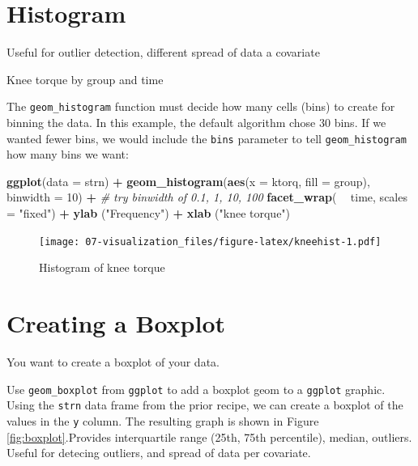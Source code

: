 \documentclass[
]{book}
\newenvironment{Shaded}{\begin{snugshade}}{\end{snugshade}}
\newcommand{\CommentTok}[1]{\textcolor[rgb]{0.56,0.35,0.01}{\textit{#1}}}
\newcommand{\DataTypeTok}[1]{\textcolor[rgb]{0.13,0.29,0.53}{#1}}
\newcommand{\DecValTok}[1]{\textcolor[rgb]{0.00,0.00,0.81}{#1}}
\newcommand{\KeywordTok}[1]{\textcolor[rgb]{0.13,0.29,0.53}{\textbf{#1}}}
\newcommand{\NormalTok}[1]{#1}
\newcommand{\OperatorTok}[1]{\textcolor[rgb]{0.81,0.36,0.00}{\textbf{#1}}}
\newcommand{\StringTok}[1]{\textcolor[rgb]{0.31,0.60,0.02}{#1}}
\begin{document}
\hypertarget{histogram}{%
\section{Histogram}\label{histogram}}

Useful for outlier detection, different spread of data a covariate

Knee torque by group and time

The \texttt{geom\_histogram} function must decide how many cells (bins) to create for
binning the data. In this example, the default algorithm chose 30
bins. If we wanted fewer bins, we would include the \texttt{bins} parameter to tell \texttt{geom\_histogram} how many bins we want:

\begin{Shaded}
\begin{Highlighting}[]
\KeywordTok{ggplot}\NormalTok{(}\DataTypeTok{data =}\NormalTok{ strn) }\OperatorTok{+}
\KeywordTok{geom_histogram}\NormalTok{(}\KeywordTok{aes}\NormalTok{(}\DataTypeTok{x =}\NormalTok{ ktorq, }\DataTypeTok{fill =}\NormalTok{ group), }\DataTypeTok{binwidth =} \DecValTok{10}\NormalTok{) }\OperatorTok{+}\StringTok{ }\CommentTok{# try binwidth of 0.1, 1, 10, 100}
\KeywordTok{facet_wrap}\NormalTok{(  }\OperatorTok{~}\StringTok{ }\NormalTok{time, }\DataTypeTok{scales =} \StringTok{"fixed"}\NormalTok{) }\OperatorTok{+}
\KeywordTok{ylab}\NormalTok{ (}\StringTok{"Frequency"}\NormalTok{) }\OperatorTok{+}
\KeywordTok{xlab}\NormalTok{ (}\StringTok{"knee torque"}\NormalTok{)}
\end{Highlighting}
\end{Shaded}

\begin{figure}
\centering
\texttt{[image: 07-visualization\_files/figure-latex/kneehist-1.pdf]}
\caption{\label{fig:kneehist}Histogram of knee torque}
\end{figure}

\hypertarget{creating-a-boxplot}{%
\section{Creating a Boxplot}\label{creating-a-boxplot}}

You want to create a boxplot of your data.

Use \texttt{geom\_boxplot} from \texttt{ggplot} to add a boxplot geom to a \texttt{ggplot} graphic. Using the \texttt{strn} data frame from the prior recipe, we can create a boxplot of the values in the \texttt{y} column. The resulting graph is shown in Figure \ref{fig:boxplot}.Provides interquartile range (25th, 75th percentile), median, outliers. Useful for detecing outliers, and spread of data per covariate.
\end{document}
